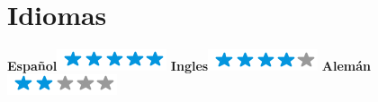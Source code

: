 \begin{aside}
    ~
    ~
    ~
    ~
    ~
    ~
    ~
    ~
    ~
    ~
    ~
    ~
    \section{Idiomas}
    \textbf{Español}\includegraphics[scale=0.40]{img/5stars.png}
    \textbf{Ingles}\includegraphics[scale=0.40]{img/4stars.png}
    \textbf{Alemán}\includegraphics[scale=0.40]{img/2stars.png}
\end{aside}
